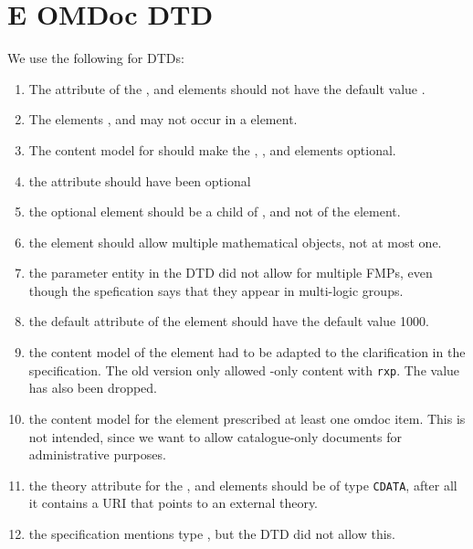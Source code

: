 \section*{E OMDoc DTD}
We use the following {} for DTDs: {}
\begin{enumerate}
\item The {} attribute of the {},
  {} and {} elements should not have the default value
  {}.
\item The elements {}, {} and
  {} may not occur in a {} element.
\item The content model for {} should make the {},
  {}, and {} elements optional.
\item the attribute {} should have been optional
\item the optional {} element should be a child of {},
  and not of the {} element.
\item the {} element should allow multiple mathematical objects,
  not at most one.
\item the {} parameter entity in the DTD did not allow for multiple
  FMPs, even though the spefication says that they appear in multi-logic groups.
\item the default {} attribute of the
  {} element should have the default value 1000. 
\item the content model of the {} element had to be adapted to
  the clarification in the specification. The old version only allowed
  {}-only content with {\tt{rxp}}. The value
  {} has also been dropped.
\item the content model for the {} element prescribed at least one
  omdoc item. This is not intended, since we want to allow catalogue-only
  documents for administrative purposes. 
\item the theory attribute for the {} {},
  {} and {} elements should be of type
  {\tt{CDATA}}, after all it contains a URI that points to an external theory.
\item the specification mentions type {}, but the
  DTD did not allow this.
\end{enumerate}

